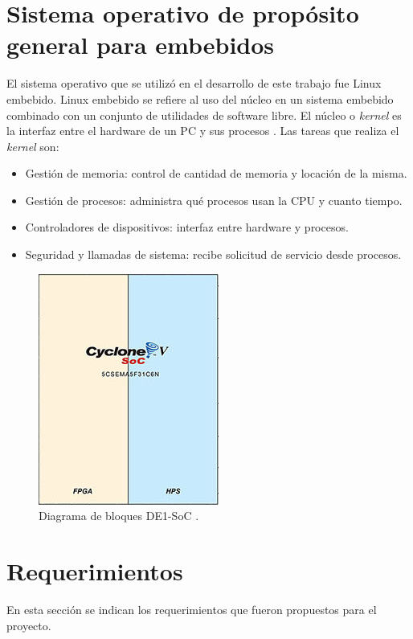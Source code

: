 \pagebreak
\section{Sistema operativo de propósito general para embebidos}

El sistema operativo que se utilizó en el desarrollo de este trabajo fue Linux embebido. Linux embebido se refiere al uso del núcleo en un sistema embebido combinado con un conjunto de utilidades de software libre. 
El núcleo o \textit{kernel} es la interfaz entre el hardware de un PC y sus procesos \citep{KERNEL}. Las tareas que realiza el \textit{kernel} son:

\begin{itemize}
\item Gestión de memoria: control de cantidad de memoria y locación de la misma.
\item Gestión de procesos: administra qué procesos usan la CPU y cuanto tiempo.
\item Controladores de dispositivos: interfaz entre hardware y procesos.
\item Seguridad y llamadas de sistema: recibe solicitud de servicio desde procesos. 
\end{itemize}

\begin{figure}[htpb]
	\centering
	\includegraphics[scale=0.7]{Figures/fpgablock.jpg}  
	\caption{Diagrama de bloques DE1-SoC \protect\footnotemark.}
	\label{fig:DE1BLOCK}
\end{figure}



\section{Requerimientos}
En esta sección se indican los requerimientos que fueron propuestos para el proyecto.

